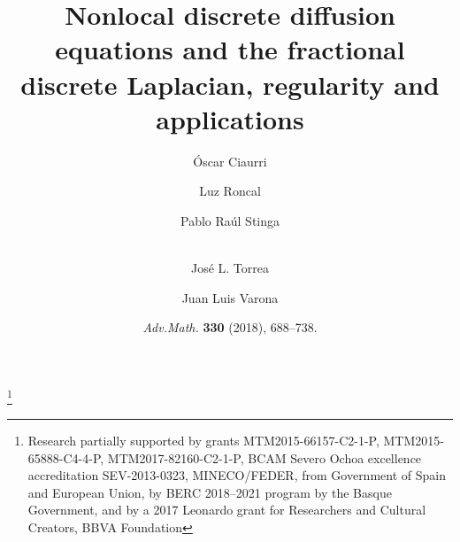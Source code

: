 \documentclass[a4paper,11pt,reqno]{amsart}
\theoremstyle{definition}
\numberwithin{equation}{section}
\begin{document}

\title[Nonlocal discrete diffusion equations, regularity and applications]
{Nonlocal discrete diffusion equations and the fractional discrete Laplacian, regularity and applications}

\author[\'O. Ciaurri, L. Roncal, P. R. Stinga, J. L. Torrea, and J. L. Varona]
{\'Oscar Ciaurri \and Luz Roncal \and Pablo Ra\'ul Stinga \and \\ Jos\'e L. Torrea \and Juan Luis Varona}

\address[\'O. Ciaurri and J. L. Varona]{%
Departamento de Matem\'aticas y Computaci\'on\\
Universidad de La Rioja\\
26006 Logro\~no, Spain}

\address[L. Roncal]{%
Basque Center for Applied Mathematics (BCAM)\\
Alameda de Mazarredo 14\\
48009 Bilbao, Spain}

\address[P. R. Stinga]{Department of Mathematics\\
Iowa State University\\
396 Carver Hall, Ames, IA\\
50011, USA}

\address[J. L. Torrea]{Departamento de Matem\'aticas, Facultad de Ciencias\\
Universidad Aut\'onoma de Madrid\\
28049 Madrid, Spain}

\renewcommand{\datename}{\textbf{This paper has been published in}:}
\date{\textit{Adv.\@ Math.\@} \textbf{330} (2018), 688--738.}

\thanks{Research partially supported by grants MTM2015-66157-C2-1-P, MTM2015-65888-C4-4-P, MTM2017-82160-C2-1-P, BCAM Severo Ochoa excellence accreditation SEV-2013-0323, MINECO/FEDER, from Government of Spain and European Union, by BERC 2018--2021 program by the Basque Government, and by a 2017 Leonardo grant for Researchers and Cultural Creators, BBVA Foundation}
\end{document}
